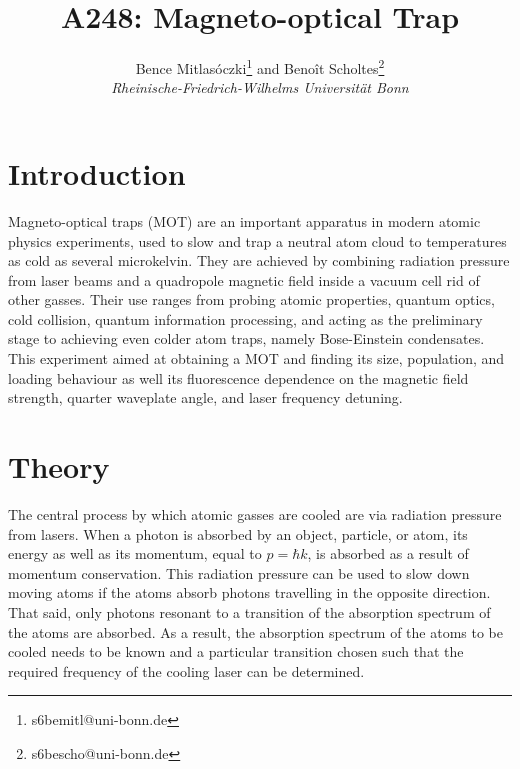 \documentclass[twocolumn]{article}
\title{\textbf{A248: Magneto-optical Trap}}
\author{Bence Mitlasóczki\thanks{s6bemitl@uni-bonn.de} and Beno\^it Scholtes\thanks{s6bescho@uni-bonn.de} \\ \textit{Rheinische-Friedrich-Wilhelms Universit\"at Bonn}}
\begin{document}
\renewcommand{\abstractname}{\vspace{-\baselineskip}} %
\maketitle
\saythanks %
\section{Introduction}
Magneto-optical traps (MOT) are an important apparatus in modern atomic physics experiments, used to slow and trap a neutral atom cloud to temperatures as cold as several microkelvin. They are achieved by combining radiation pressure from laser beams and a quadropole magnetic field inside a vacuum cell rid of other gasses. Their use ranges from probing atomic properties, quantum optics, cold collision, quantum information processing, and acting as the preliminary stage to achieving even colder atom traps, namely Bose-Einstein condensates. This experiment aimed at obtaining a MOT and finding its size, population, and loading behaviour as well its fluorescence dependence on the magnetic field strength, quarter waveplate angle, and laser frequency detuning.

\section{Theory}
The central process by which atomic gasses are cooled are via radiation pressure from lasers. When a photon is absorbed by an object, particle, or atom, its energy as well as its momentum, equal to $p=\hbar k$, is absorbed as a result of momentum conservation. This radiation pressure can be used to slow down moving atoms if the atoms absorb photons travelling in the opposite direction. That said, only photons resonant to a transition of the absorption spectrum of the atoms are absorbed. As a result, the absorption spectrum of the atoms to be cooled needs to be known and a particular transition chosen such that the required frequency of the cooling laser can be determined.
\end{document}
